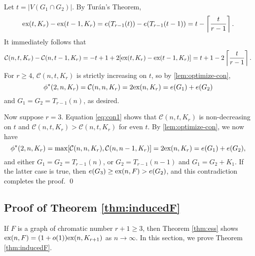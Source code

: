 \documentclass[12pt]{article}
\newcommand*{\ex}{\textnormal{ex}}
\newcommand*{\con}{\mathcal{C}}
\begin{document}
Let $t = |V(G_1 \cap G_2)|$. By Turán's Theorem,
\[
  \ex(t, K_{r}) - \ex(t - 1, K_{r}) = e(T_{r - 1}(t)) - e(T_{r - 1}(t - 1)) = t - \left\lceil \frac{t}{r - 1} \right\rceil.
\]
It immediately follows that
\begin{equation}
  \con(n, t, K_r) - \con(n, t - 1, K_r) = - t + 1 + 2[\ex(t, K_r) - \ex(t - 1, K_r)] = t + 1 - 2\left\lceil \frac{t}{r - 1} \right\rceil. \label{eq:con1}
\end{equation}
For $r \geq 4$, $\con(n, t, K_r)$ is strictly increasing on $t$, so by \cref{lem:optimize-con}, 
\[
  \phi^*(2, n, K_r) = \con(n, n, K_r) = 2\ex(n, K_r) = e(G_1) + e(G_2)
\]
and $G_1 = G_2 = T_{r - 1}(n)$, as desired. 

Now suppose $r = 3$. Equation \eqref{eq:con1} shows that $\con(n, t, K_r)$ is non-decreasing on $t$ and $\con(n, t, K_r) > \con(n, t, K_r)$ for even $t$. By \cref{lem:optimize-con}, we now have 
\[
  \phi^*(2, n, K_r) = \max[\con(n, n, K_r), \con(n, n - 1, K_r)] = 2\ex(n, K_r) = e(G_1) + e(G_2),
\]
and either $G_1 = G_2 = T_{r - 1}(n)$, or $G_2 = T_{r - 1}(n - 1)$ and $G_1 = G_2 + K_1$. If the latter case is true, then $e(G_3) \geq \ex(n, F) > e(G_2)$, and this contradiction completes the proof. \qed

\subsection{Proof of Theorem \ref{thm:inducedF}}

If $F$ is a graph of chromatic number $r + 1 \geq 3$, then Theorem \ref{thm:ess} shows 
$\ex(n,F)= (1 + o(1))\ex(n,K_{r+1})$ as $n \rightarrow \infty$. In this section, we prove Theorem \ref{thm:inducedF}.
\end{document}

